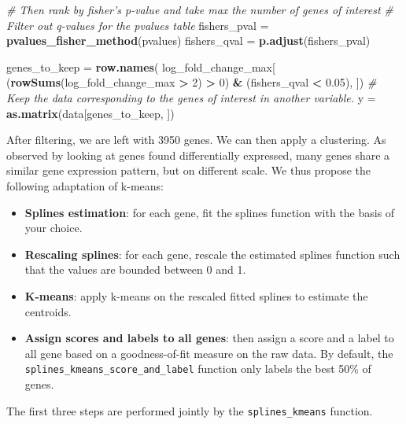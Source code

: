 \documentclass[9pt,a4paper,]{extarticle}
\newenvironment{Shaded}{\begin{snugshade}}{\end{snugshade}}
\newcommand{\CommentTok}[1]{\textcolor[rgb]{0.56,0.35,0.01}{\textit{#1}}}
\newcommand{\DecValTok}[1]{\textcolor[rgb]{0.00,0.00,0.81}{#1}}
\newcommand{\FloatTok}[1]{\textcolor[rgb]{0.00,0.00,0.81}{#1}}
\newcommand{\KeywordTok}[1]{\textcolor[rgb]{0.13,0.29,0.53}{\textbf{#1}}}
\newcommand{\NormalTok}[1]{#1}
\newcommand{\OperatorTok}[1]{\textcolor[rgb]{0.81,0.36,0.00}{\textbf{#1}}}
\newcommand{\StringTok}[1]{\textcolor[rgb]{0.31,0.60,0.02}{#1}}
\begin{document}
\begin{Shaded}
\begin{Highlighting}[]
\CommentTok{# Then rank by fisher's p-value and take max the number of genes of interest}
\CommentTok{# Filter out q-values for the pvalues table}
\NormalTok{fishers_pval =}\StringTok{ }\KeywordTok{pvalues_fisher_method}\NormalTok{(pvalues)}
\NormalTok{fishers_qval =}\StringTok{ }\KeywordTok{p.adjust}\NormalTok{(fishers_pval)}

\NormalTok{genes_to_keep =}\StringTok{ }\KeywordTok{row.names}\NormalTok{(}
\NormalTok{    log_fold_change_max[}
\NormalTok{    (}\KeywordTok{rowSums}\NormalTok{(log_fold_change_max }\OperatorTok{>}\StringTok{ }\DecValTok{2}\NormalTok{) }\OperatorTok{>}\StringTok{ }\DecValTok{0}\NormalTok{) }\OperatorTok{&}
\StringTok{    }\NormalTok{(fishers_qval }\OperatorTok{<}\StringTok{ }\FloatTok{0.05}\NormalTok{), ])}
\CommentTok{# Keep the data corresponding to the genes of interest in another variable.}
\NormalTok{y =}\StringTok{ }\KeywordTok{as.matrix}\NormalTok{(data[genes_to_keep, ])}
\end{Highlighting}
\end{Shaded}

After filtering, we are left with 3950 genes. We can then apply a
clustering. As observed by looking at genes found differentially expressed,
many genes share a similar gene expression pattern, but on different scale.
We thus propose the following adaptation of k-means:

\begin{itemize}
\tightlist
\item
  \textbf{Splines estimation}: for each gene, fit the splines function with the basis
  of your choice.
\item
  \textbf{Rescaling splines}: for each gene, rescale the estimated splines function
  such that the values are bounded between 0 and 1.
\item
  \textbf{K-means}: apply k-means on the rescaled fitted splines to estimate the
  centroids.
\item
  \textbf{Assign scores and labels to all genes}: then assign a score and a label
  to all gene based on a goodness-of-fit measure on the raw data. By default,
  the \texttt{splines\_kmeans\_score\_and\_label} function only labels the best 50\% of
  genes.
\end{itemize}

The first three steps are performed jointly by the \texttt{splines\_kmeans} function.
\end{document}
